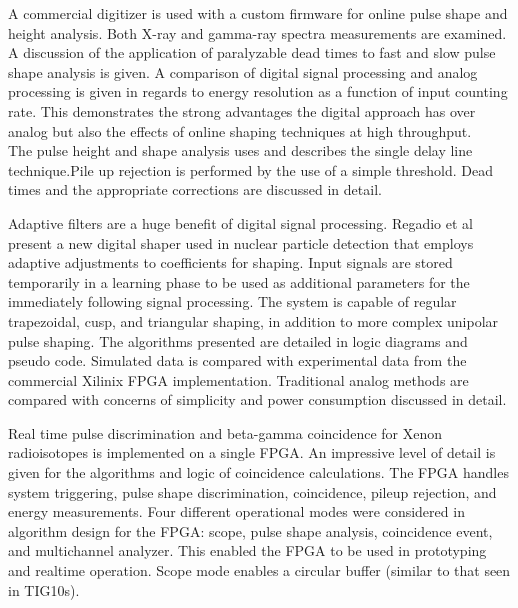 \documentclass[12pt]{article}
\begin{document}
\begin{doublespacing}
{\large\textbf{\cite{Abbene2013124}}}
A commercial digitizer is used with a custom firmware for online pulse shape and height analysis. Both X-ray and gamma-ray spectra measurements are examined. A discussion of the application of paralyzable dead times to fast and slow pulse shape analysis is given. A comparison of digital signal processing and analog processing is given in regards to energy resolution as a function of input counting rate. This demonstrates the strong advantages the digital approach has over analog but also the effects of online shaping techniques at high throughput.
\\
The pulse height and shape analysis uses and describes the single delay line technique.Pile up rejection is performed by the use of a simple threshold. Dead times and the appropriate corrections are discussed in detail.
\\[20pt]


{\large\textbf{\cite{Regadio2014297}}}

Adaptive filters are a huge benefit of digital signal processing. Regadio et al present a new digital shaper used in nuclear particle detection that employs adaptive adjustments to coefficients for shaping. Input signals are stored temporarily in a learning phase to be used as additional parameters for the immediately following signal processing. The system is capable of regular trapezoidal, cusp, and triangular shaping, in addition to more complex unipolar pulse shaping. The algorithms presented are detailed in logic diagrams and pseudo code. Simulated data is compared with experimental data from the commercial Xilinix FPGA implementation. Traditional analog methods are compared with concerns of simplicity and power consumption discussed in detail.
\\[20pt]


{\large\textbf{\cite{Farsoni201375}}}

Real time pulse discrimination and beta-gamma coincidence for Xenon radioisotopes is implemented on a single FPGA. An impressive level of detail is given for the algorithms and logic of coincidence calculations. The FPGA handles system triggering, pulse shape discrimination, coincidence, pileup rejection, and energy measurements. Four different operational modes were considered in algorithm design for the FPGA: scope, pulse shape analysis, coincidence event, and multichannel analyzer. This enabled the FPGA to be used in prototyping and realtime operation. Scope mode enables a circular buffer (similar to that seen in TIG10s).
\\[20pt]



\end{doublespacing}
\end{document}
